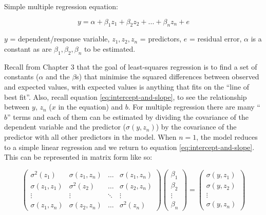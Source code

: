 \documentclass[
]{book}
\begin{document}
Simple multiple regression equation:

\begin{equation}
    y = \alpha + \beta_1z_1 + \beta_2z_2 + ... + \beta_nz_n + e
    \label{eq:simple-multiple-regression}
\end{equation}

\(y\) = dependent/response variable, \(z_1, z_2, z_n\) = predictors, \(e\) = residual error, \(\alpha\) is a constant as are \(\beta_1, \beta_2, \beta_n\) to be estimated.

Recall from Chapter 3 that the goal of least-squares regression is to find a set of constants (\(\alpha\) and the \(\beta\)s) that minimise the squared differences between observed and expected values, with expected values is anything that fits on the ``line of best fit''. Also, recall equation \eqref{eq:intercept-and-slope}, to see the relationship between \(y\), \(z_n\) (\(x\) in the equation) and \(b\). For multiple regression there are many ``\(b\)'' terms and each of them can be estimated by dividing the covariance of the dependent variable and the predictor (\(\sigma(y, z_n)\)) by the covariance of the predictor with all other predictors in the model. When \(n = 1\), the model reduces to a simple linear regression and we return to equation \eqref{eq:intercept-and-slope}. This can be represented in matrix form like so:

\begin{equation}
    \begin{pmatrix}
        \sigma^2(z_1) & \sigma(z_1, z_n) & \dots & \sigma(z_1, z_n) \\
        \sigma(z_1, z_1) & \sigma^2(z_2) & \dots & \sigma(z_2, z_n) \\
        \vdots & \vdots & \ddots & \vdots \\
        \sigma(z_1, z_n) & \sigma(z_2, z_n) & \dots & \sigma^2(z_n)
    \end{pmatrix}
    \begin{pmatrix}
        \beta_1 \\
        \beta_2 \\
        \vdots \\
        \beta_n
    \end{pmatrix}
    =
    \begin{pmatrix}
        \sigma(y, z_1) \\
        \sigma(y, z_2) \\
        \vdots \\
        \sigma(y, z_n)
    \end{pmatrix}
    \label{eq:multiple-regression-matrix-form}
\end{equation}
\end{document}
